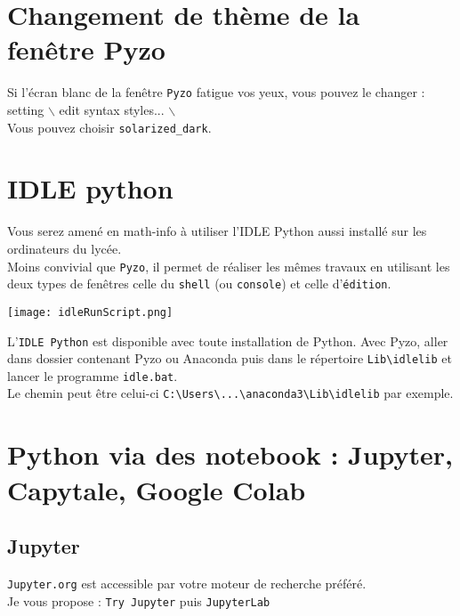 \section{Changement de thème de la fenêtre Pyzo}
Si l'écran blanc de la fenêtre \texttt{Pyzo} fatigue vos yeux, vous pouvez le changer :\\
setting $\backslash$ edit syntax styles... $\backslash$ \\
Vous pouvez choisir \texttt{solarized\_dark}.


\section{IDLE python}
Vous serez amené en math-info à utiliser l'IDLE Python aussi installé sur les ordinateurs du lycée.\\
Moins convivial que \texttt{Pyzo}, il permet de réaliser les mêmes travaux en utilisant les deux types de fenêtres celle du \texttt{shell} (ou \texttt{console}) et celle d'\texttt{édition}.

\begin{center}
\texttt{[image: idleRunScript.png]}
\end{center}


L'\texttt{IDLE Python} est disponible avec toute installation de Python. Avec Pyzo, aller dans dossier contenant Pyzo ou Anaconda puis dans le répertoire \texttt{Lib\textbackslash idlelib} et lancer le programme \texttt{idle.bat}.\\
Le chemin peut être celui-ci \texttt{C:\textbackslash Users\textbackslash ...\textbackslash anaconda3\textbackslash Lib\textbackslash idlelib} par exemple.

\section{Python via des notebook : Jupyter, Capytale, Google Colab}

\subsection{Jupyter}
\texttt{Jupyter.org} est accessible par votre moteur de recherche préféré.\\
Je vous propose : \texttt{Try Jupyter} puis \texttt{JupyterLab}


